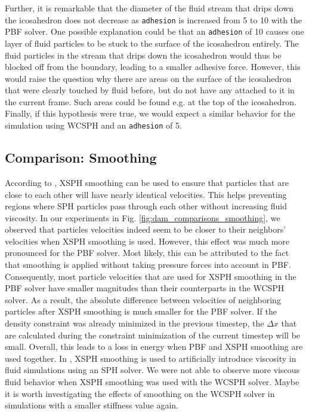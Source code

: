 \documentclass[11pt, letterpaper, twocolumn]{article}
\begin{document}
Further, it is remarkable that the diameter of the fluid stream that drips down the icosahedron does not decrease as \texttt{adhesion} is increased from 5 to 10 with the PBF solver. One possible explanation could be that an \texttt{adhesion} of 10 causes one layer of fluid particles to be stuck to the surface of the icosahedron entirely. The fluid particles
in the stream that drips down the icosahedron would thus be blocked off from the boundary, leading to a smaller adhesive force. However, this would raise the question why there are areas on the surface of the icosahedron that were clearly touched by fluid before, but do not have any attached to it in the current frame. Such areas could be found e.g. at the top
of the icosahedron. Finally, if this hypothesis were true, we would expect a similar behavior for the simulation using WCSPH and an \texttt{adhesion} of 5.

\subsection{Comparison: Smoothing}
\label{disc:comparison_smoothing}
According to \cite{monaghan1989}, XSPH smoothing can be used to ensure that particles that are close to each other will have nearly identical velocities. This helps preventing regions where SPH particles pass through each other without increasing fluid viscosity. In our experiments in Fig. \ref{fig:dam_comparisons_smoothing}, we observed that particles velocities 
indeed seem to be closer to their neighbors' velocities when XSPH smoothing is used. However, this effect was much more pronounced for the PBF solver. Most likely, this can be attributed to the fact that smoothing is applied without taking pressure forces into account in PBF. Consequently, most particle velocities that are used for XSPH smoothing in the PBF solver have smaller
magnitudes than their counterparts in the WCSPH solver. As a result, the absolute difference between velocities of neighboring particles after XSPH smoothing is much smaller for the PBF solver. If the density constraint was already minimized in the previous timestep, the $\Delta x$ that are calculated during the constraint minimization of the current timestep will be small.
Overall, this leads to a loss in energy when PBF and XSPH smoothing are used together. In \cite{schechter2012}, XSPH smoothing is used to artificially introduce viscosity in fluid simulations using an SPH solver. We were not able to observe more viscous fluid behavior when XSPH smoothing was used with the WCSPH solver. Maybe it is worth investigating the effects of smoothing
on the WCSPH solver in simulations with a smaller stiffness value again.
\end{document}
